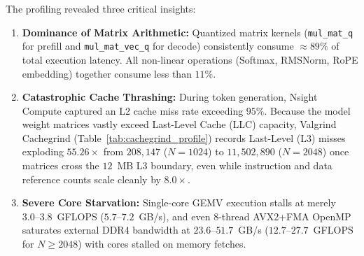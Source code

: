 \documentclass[conference]{IEEEtran}
\begin{document}
The profiling revealed three critical insights:
\begin{enumerate}
    \item \textbf{Dominance of Matrix Arithmetic:} Quantized matrix kernels (\texttt{mul\_mat\_q} for prefill and \texttt{mul\_mat\_vec\_q} for decode) consistently consume $\approx 89\%$ of total execution latency. All non-linear operations (Softmax, RMSNorm, RoPE embedding) together consume less than $11\%$.
    \item \textbf{Catastrophic Cache Thrashing:} During token generation, Nsight Compute captured an L2 cache miss rate exceeding $95\%$. Because the model weight matrices vastly exceed Last-Level Cache (LLC) capacity, Valgrind Cachegrind (Table~\ref{tab:cachegrind_profile}) records Last-Level (L3) misses exploding $55.26\times$ from $208,147$ ($N=1024$) to $11,502,890$ ($N=2048$) once matrices cross the $12$~MB L3 boundary, even while instruction and data reference counts scale cleanly by $8.0\times$.
    \item \textbf{Severe Core Starvation:} Single-core GEMV execution stalls at merely $3.0\text{--}3.8$~GFLOPS ($5.7\text{--}7.2$~GB/s), and even 8-thread AVX2+FMA OpenMP saturates external DDR4 bandwidth at $23.6\text{--}51.7$~GB/s ($12.7\text{--}27.7$~GFLOPS for $N \ge 2048$) with cores stalled on memory fetches.
\end{enumerate}

\begin{table}[t]
\centering
\caption{Valgrind Cachegrind LLC Thrashing Inflection Across the 12~MB L3 Boundary (Blocked GEMM)}
\label{tab:cachegrind_profile}
\footnotesize
\setlength{\tabcolsep}{4pt}
\end{table}
\end{document}
